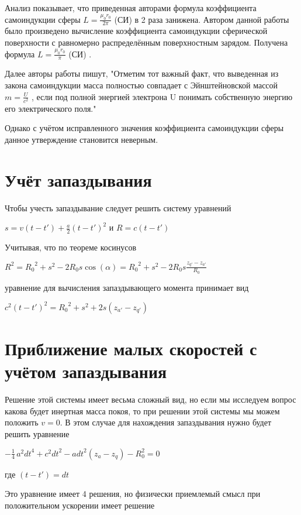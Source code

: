 \documentclass{article}
\begin{document}
Анализ показывает, что приведенная авторами формула коэффициента самоиндукции сферы $L =\frac{{{\mu }_{0}}{r}_{0}}{2\pi }$ (СИ) в 2 раза занижена. Автором данной работы было произведено вычисление коэффициента самоиндукции сферической поверхности с равномерно распределённым поверхностным зарядом. Получена формула $L =\frac{{{\mu }_{0}}{r}_{0}}{\pi }$ (СИ) .

Далее авторы  работы \cite{misyuchenko} пишут, "Отметим тот важный факт, что выведенная из закона самоиндукции масса полностью совпадает с Эйнштейновской массой $m=\frac{U}{c^2}$ , если под полной энергией электрона U понимать собственную энергию его электрического поля."

Однако с учётом исправленного значения коэффициента самоиндукции сферы данное утверждение становится неверным.


\section{Учёт запаздывания}

Чтобы учесть запаздывание следует решить систему уравнений

$s=v\left( t-t' \right)+\frac{a}{2}{{\left( t-t' \right)}^{2}}$
и
$R=c\left( t-t' \right)$

Учитывая, что по теореме косинусов

${{R}^{2}}={{R}_{0}}^{2}+{{s}^{2}}-2{{R}_{0}}s\cos \left( \alpha  \right)={{R}_{0}}^{2}+{{s}^{2}}-2{{R}_{0}}s\frac{{{z}_{q'}}-{{z}_{a'}}}{{{R}_{0}}}$

уравнение для вычисления запаздывающего момента принимает вид

$c^{2}\left( t-t' \right)^{2}={{R}_{0}}^{2}+{{s}^{2}}+2s\left( {{z}_{a'}}-{{z}_{q'}} \right)$

\section{Приближение малых скоростей с учётом запаздывания}
Решение этой системы имеет весьма сложный вид, но если мы исследуем вопрос какова будет инертная масса покоя, то при решении этой системы мы можем положить $v = 0$. В этом случае для нахождения запаздывания нужно будет решить уравнение

$-\frac{1}{4} \, a^{2} \mathit{dt}^{4} + c^{2} \mathit{dt}^{2} - a \mathit{dt}^{2} {\left(z_{a} - z_{q}\right)} - R_{0}^{2} = 0$

где
$(t-t') = dt$

Это уравнение имеет 4 решения, но физически приемлемый смысл при положительном ускорении имеет решение
\end{document}
